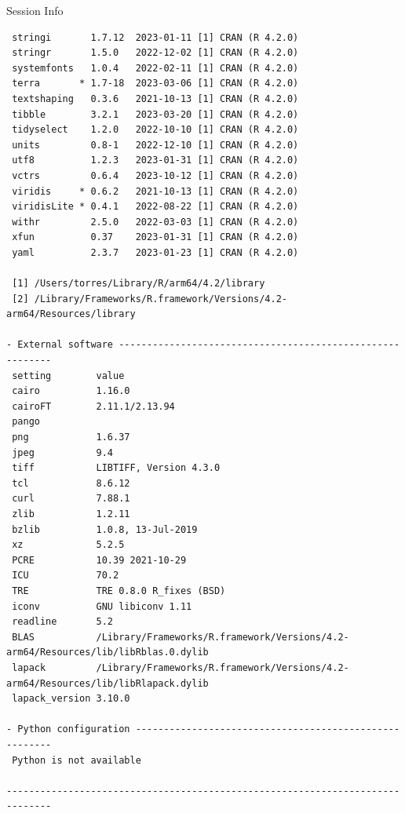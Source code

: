 \documentclass[
  ignorenonframetext,
  aspectratio=169,
]{beamer}
\newif\ifbibliography
\begin{document}
\begin{frame}[fragile]{Session Info}
\begin{verbatim}
 stringi       1.7.12  2023-01-11 [1] CRAN (R 4.2.0)
 stringr       1.5.0   2022-12-02 [1] CRAN (R 4.2.0)
 systemfonts   1.0.4   2022-02-11 [1] CRAN (R 4.2.0)
 terra       * 1.7-18  2023-03-06 [1] CRAN (R 4.2.0)
 textshaping   0.3.6   2021-10-13 [1] CRAN (R 4.2.0)
 tibble        3.2.1   2023-03-20 [1] CRAN (R 4.2.0)
 tidyselect    1.2.0   2022-10-10 [1] CRAN (R 4.2.0)
 units         0.8-1   2022-12-10 [1] CRAN (R 4.2.0)
 utf8          1.2.3   2023-01-31 [1] CRAN (R 4.2.0)
 vctrs         0.6.4   2023-10-12 [1] CRAN (R 4.2.0)
 viridis     * 0.6.2   2021-10-13 [1] CRAN (R 4.2.0)
 viridisLite * 0.4.1   2022-08-22 [1] CRAN (R 4.2.0)
 withr         2.5.0   2022-03-03 [1] CRAN (R 4.2.0)
 xfun          0.37    2023-01-31 [1] CRAN (R 4.2.0)
 yaml          2.3.7   2023-01-23 [1] CRAN (R 4.2.0)

 [1] /Users/torres/Library/R/arm64/4.2/library
 [2] /Library/Frameworks/R.framework/Versions/4.2-arm64/Resources/library

- External software ----------------------------------------------------------
 setting        value
 cairo          1.16.0
 cairoFT        2.11.1/2.13.94
 pango
 png            1.6.37
 jpeg           9.4
 tiff           LIBTIFF, Version 4.3.0
 tcl            8.6.12
 curl           7.88.1
 zlib           1.2.11
 bzlib          1.0.8, 13-Jul-2019
 xz             5.2.5
 PCRE           10.39 2021-10-29
 ICU            70.2
 TRE            TRE 0.8.0 R_fixes (BSD)
 iconv          GNU libiconv 1.11
 readline       5.2
 BLAS           /Library/Frameworks/R.framework/Versions/4.2-arm64/Resources/lib/libRblas.0.dylib
 lapack         /Library/Frameworks/R.framework/Versions/4.2-arm64/Resources/lib/libRlapack.dylib
 lapack_version 3.10.0

- Python configuration -------------------------------------------------------
 Python is not available

------------------------------------------------------------------------------
\end{verbatim}

\linespread{2}
\end{frame}


\begin{frame}[allowframebreaks]{}
  \bibliographytrue
\end{frame}
\end{document}
